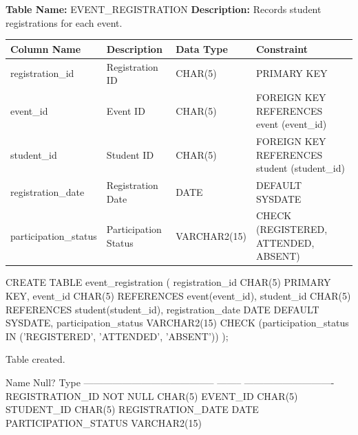 
\textbf{Table Name:} EVENT\_REGISTRATION \hspace{1em plus 1fill}
\textbf{Description:} Records student registrations for each event.

\vspace{8pt}

\renewcommand{\arraystretch}{1.4}
\begin{tabularx}{\textwidth}{|>{\raggedright\arraybackslash}X|>{\raggedright\arraybackslash}X|>{\raggedright\arraybackslash}X|>{\raggedright\arraybackslash}X|}
\hline
\textbf{Column Name} & \textbf{Description} & \textbf{Data Type} & \textbf{Constraint} \\
\hline
registration\_id & Registration ID & CHAR(5) & PRIMARY KEY \\
\hline
event\_id & Event ID & CHAR(5) & FOREIGN KEY REFERENCES event (event\_id) \\
\hline
student\_id & Student ID & CHAR(5) & FOREIGN KEY REFERENCES student (student\_id) \\
\hline
registration\_date & Registration Date & DATE & DEFAULT SYSDATE \\
\hline
participation\_status & Participation Status & VARCHAR2(15) & CHECK (REGISTERED, ATTENDED, ABSENT) \\
\hline
\end{tabularx}

\vspace{14pt}


\begin{sqlcode}
CREATE TABLE event_registration (
    registration_id      CHAR(5)       PRIMARY KEY,
    event_id             CHAR(5)       REFERENCES event(event_id),
    student_id           CHAR(5)       REFERENCES student(student_id),
    registration_date    DATE          DEFAULT SYSDATE,
    participation_status VARCHAR2(15)
        CHECK (participation_status IN ('REGISTERED', 'ATTENDED', 'ABSENT'))
);
\end{sqlcode}

\vspace{16pt}


\begin{sqlout}
Table created.

 Name                                      Null?    Type
 ----------------------------------------- -------- ----------------------------
 REGISTRATION_ID                           NOT NULL CHAR(5)
 EVENT_ID                                           CHAR(5)
 STUDENT_ID                                         CHAR(5)
 REGISTRATION_DATE                                  DATE
 PARTICIPATION_STATUS                               VARCHAR2(15)
\end{sqlout}

\clearpage
